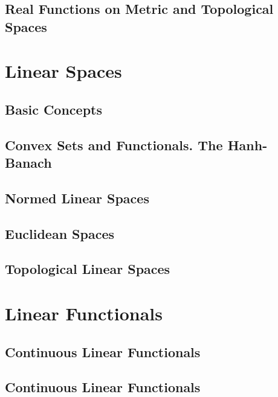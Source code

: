 \documentclass[12pt]{article}
\begin{document}
\subsection{Real Functions on Metric and Topological Spaces}


\section{Linear Spaces}
\subsection{Basic Concepts}
\subsection{Convex Sets and Functionals. The Hanh-Banach}
\subsection{Normed Linear Spaces}
\subsection{Euclidean Spaces}
\subsection{Topological Linear Spaces}


\section{Linear Functionals}
\subsection{Continuous Linear Functionals}
\subsection{Continuous Linear Functionals}
\end{document}
